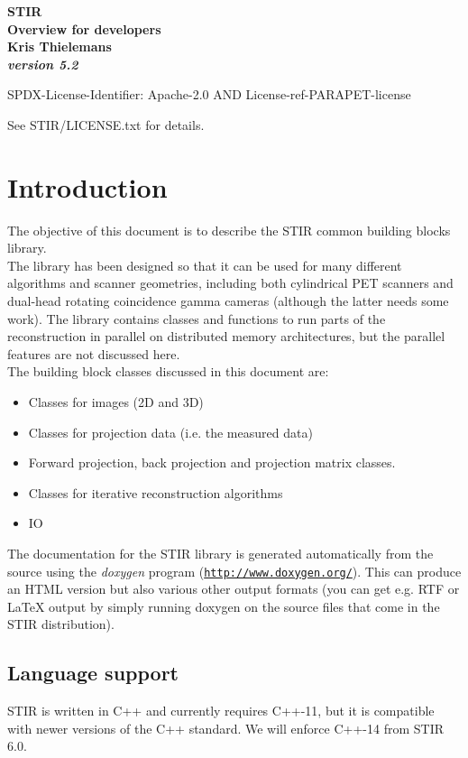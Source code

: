 \documentclass{article}
\def\R2Lurl#1#2{\mbox{\href{#1}{\tt #2}}}
\begin{document}
\begin{center}
\textbf{{\huge STIR \\
Overview for developers}}\\
\textbf{Kris Thielemans}\\
\textbf{\textit{version 5.2}}

\end{center}

SPDX-License-Identifier: Apache-2.0 AND License-ref-PARAPET-license

See STIR/LICENSE.txt for details.

\tableofcontents


\section{
Introduction}

The objective of this document is to describe the STIR common 
building blocks library.\\
The library has been designed so that it can be used for many 
different algorithms and scanner geometries, including both cylindrical 
PET scanners and dual-head rotating coincidence gamma cameras 
(although the latter needs some work). The library contains classes 
and functions to run parts of the reconstruction in parallel 
on distributed memory architectures, but the parallel features 
are not discussed here.\\
The building block classes discussed in this document are:
\begin{itemize}
\item
Classes for images (2D and 3D)
\item 
Classes for projection data (i.e. the measured data)
\item 
Forward projection, back projection and projection matrix classes.
\item 
Classes for iterative reconstruction algorithms
\item IO
\end{itemize}

The documentation
for the STIR library is generated automatically from the source 
using the \textit{doxygen} program (\R2Lurl{http://www.doxygen.org/ }{http://www.doxygen.org/}). 
This can produce an HTML version but also various other output 
formats (you can get e.g. RTF or LaTeX output by simply running 
doxygen on the source files that come in the STIR distribution). 

\subsection{Language support}
STIR is written in C++ and currently requires C++-11, but it is compatible with newer versions of the C++ standard.
We will enforce C++-14 from STIR 6.0.
\end{document}
